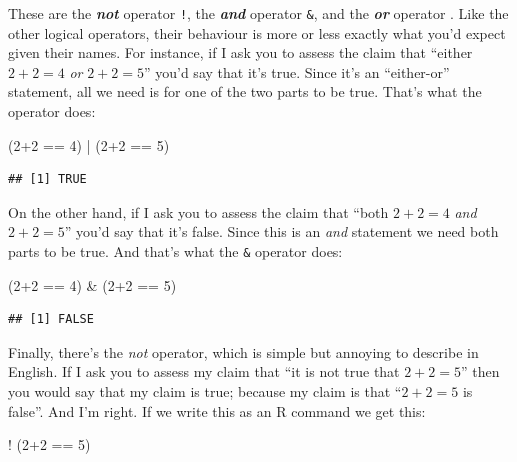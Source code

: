 \documentclass[
]{book}
\newenvironment{Shaded}{\begin{snugshade}}{\end{snugshade}}
\newcommand{\DecValTok}[1]{\textcolor[rgb]{0.00,0.00,0.81}{#1}}
\newcommand{\NormalTok}[1]{#1}
\newcommand{\SpecialCharTok}[1]{\textcolor[rgb]{0.00,0.00,0.00}{#1}}
\begin{document}
These are the \textbf{\emph{not}} operator \texttt{!}, the \textbf{\emph{and}} operator \texttt{\&}, and the \textbf{\emph{or}} operator \texttt{\textbar{}}. Like the other logical operators, their behaviour is more or less exactly what you'd expect given their names. For instance, if I ask you to assess the claim that ``either \(2+2 = 4\) \emph{or} \(2+2 = 5\)'' you'd say that it's true. Since it's an ``either-or'' statement, all we need is for one of the two parts to be true. That's what the \texttt{\textbar{}} operator does:

\begin{Shaded}
\begin{Highlighting}[]
\NormalTok{(}\DecValTok{2}\SpecialCharTok{+}\DecValTok{2} \SpecialCharTok{==} \DecValTok{4}\NormalTok{) }\SpecialCharTok{|}\NormalTok{ (}\DecValTok{2}\SpecialCharTok{+}\DecValTok{2} \SpecialCharTok{==} \DecValTok{5}\NormalTok{)}
\end{Highlighting}
\end{Shaded}

\begin{verbatim}
## [1] TRUE
\end{verbatim}

On the other hand, if I ask you to assess the claim that ``both \(2+2 = 4\) \emph{and} \(2+2 = 5\)'' you'd say that it's false. Since this is an \emph{and} statement we need both parts to be true. And that's what the \texttt{\&} operator does:

\begin{Shaded}
\begin{Highlighting}[]
\NormalTok{(}\DecValTok{2}\SpecialCharTok{+}\DecValTok{2} \SpecialCharTok{==} \DecValTok{4}\NormalTok{) }\SpecialCharTok{\&}\NormalTok{ (}\DecValTok{2}\SpecialCharTok{+}\DecValTok{2} \SpecialCharTok{==} \DecValTok{5}\NormalTok{)}
\end{Highlighting}
\end{Shaded}

\begin{verbatim}
## [1] FALSE
\end{verbatim}

Finally, there's the \emph{not} operator, which is simple but annoying to describe in English. If I ask you to assess my claim that ``it is not true that \(2+2 = 5\)'' then you would say that my claim is true; because my claim is that ``\(2+2 = 5\) is false''. And I'm right. If we write this as an R command we get this:

\begin{Shaded}
\begin{Highlighting}[]
\SpecialCharTok{!}\NormalTok{ (}\DecValTok{2}\SpecialCharTok{+}\DecValTok{2} \SpecialCharTok{==} \DecValTok{5}\NormalTok{)}
\end{Highlighting}
\end{Shaded}
\end{document}
